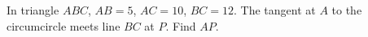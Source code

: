 In triangle $ABC$, $AB=5$, $AC=10$, $BC=12$. The tangent at $A$ to the circumcircle meets line $BC$ at $P$. Find $AP$.
